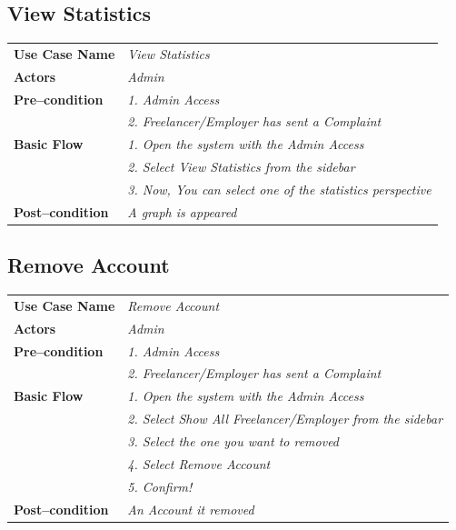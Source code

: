 \documentclass{article}
\begin{document}
\subsection{View Statistics}
    \begin{tabular}{ l | l }
    \toprule
      \rowcolor{LightCyan}
      \textbf{Use Case Name}    & \textit{View Statistics}\\
      \textbf{Actors}           & \textit{Admin}\\
      \rowcolor{LightCyan}
      \textbf{Pre--condition}   & \textit{1. Admin Access}\\
                                  \rowcolor{LightCyan}
                                & \textit{2. Freelancer/Employer has sent a Complaint}\\
      \textbf{Basic Flow}       & \textit{1. Open the system with the Admin Access}\\
                                & \textit{2. Select View Statistics from the sidebar}\\
                                & \textit{3. Now, You can select one of the statistics perspective}\\
      \rowcolor{LightCyan}
      \textbf{Post--condition}  & \textit{A graph is appeared}\\
    \toprule
    \end{tabular}




\subsection{Remove Account}
    \begin{tabular}{ l | l }
    \toprule
      \rowcolor{LightCyan}
      \textbf{Use Case Name}    & \textit{Remove Account}\\
      \textbf{Actors}           & \textit{Admin}\\
      \rowcolor{LightCyan}
      \textbf{Pre--condition}   & \textit{1. Admin Access}\\
                                  \rowcolor{LightCyan}
                                & \textit{2. Freelancer/Employer has sent a Complaint}\\
      \textbf{Basic Flow}       & \textit{1. Open the system with the Admin Access}\\
                                & \textit{2. Select Show All Freelancer/Employer from the sidebar}\\
                                & \textit{3. Select the one you want to removed}\\
                                & \textit{4. Select Remove Account}\\
                                & \textit{5. Confirm!}\\
      \rowcolor{LightCyan}
      \textbf{Post--condition}  & \textit{An Account it removed}\\
    \toprule
    \end{tabular}
\end{document}
